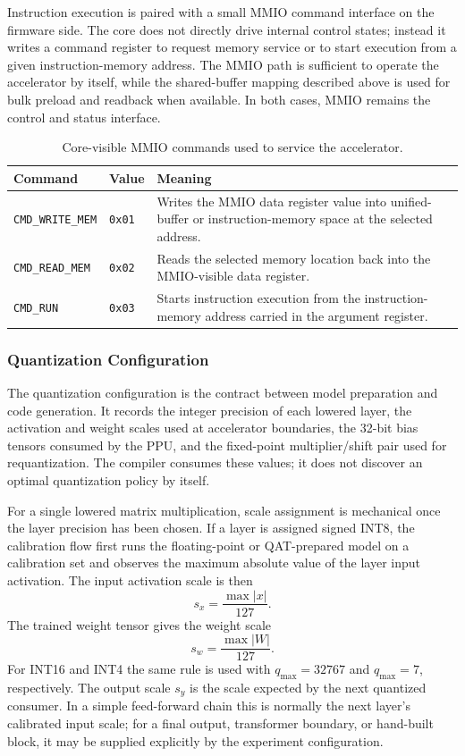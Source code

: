 \documentclass[a4paper, 12pt, titlepage]{article}
\begin{document}
Instruction execution is paired with a small MMIO command interface on the firmware side. The core does not directly drive internal control states; instead it writes a command register to request memory service or to start execution from a given instruction-memory address. The MMIO path is sufficient to operate the accelerator by itself, while the shared-buffer mapping described above is used for bulk preload and readback when available. In both cases, MMIO remains the control and status interface.

\begin{table}[H]
    \centering
    \small
    \caption{Core-visible MMIO commands used to service the accelerator.}
    \label{tab:mmio-commands}
    \begin{tabularx}{\textwidth}{|l|l|Y|}
        \hline
        \textbf{Command} & \textbf{Value} & \textbf{Meaning} \\
        \hline
        \texttt{CMD\_WRITE\_MEM} & \texttt{0x01} & Writes the MMIO data register value into unified-buffer or instruction-memory space at the selected address. \\
        \hline
        \texttt{CMD\_READ\_MEM} & \texttt{0x02} & Reads the selected memory location back into the MMIO-visible data register. \\
        \hline
        \texttt{CMD\_RUN} & \texttt{0x03} & Starts instruction execution from the instruction-memory address carried in the argument register. \\
        \hline
    \end{tabularx}
\end{table}

\subsubsection{Quantization Configuration}
The quantization configuration is the contract between model preparation and code generation. It records the integer precision of each lowered layer, the activation and weight scales used at accelerator boundaries, the 32-bit bias tensors consumed by the PPU, and the fixed-point multiplier/shift pair used for requantization. The compiler consumes these values; it does not discover an optimal quantization policy by itself.

For a single lowered matrix multiplication, scale assignment is mechanical once the layer precision has been chosen. If a layer is assigned signed INT8, the calibration flow first runs the floating-point or QAT-prepared model on a calibration set and observes the maximum absolute value of the layer input activation. The input activation scale is then
\[
    s_x = \frac{\max |x|}{127}.
\]
The trained weight tensor gives the weight scale
\[
    s_w = \frac{\max |W|}{127}.
\]
For INT16 and INT4 the same rule is used with \(q_{\max}=32767\) and \(q_{\max}=7\), respectively. The output scale \(s_y\) is the scale expected by the next quantized consumer. In a simple feed-forward chain this is normally the next layer's calibrated input scale; for a final output, transformer boundary, or hand-built block, it may be supplied explicitly by the experiment configuration.
\end{document}

